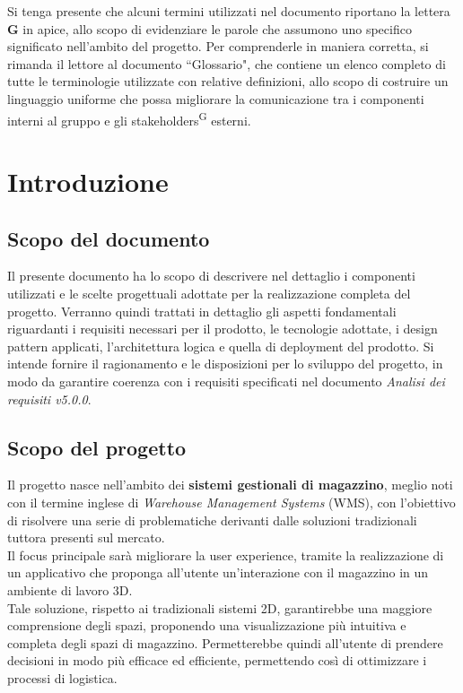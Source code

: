 \begin{beginningnote}
    Si tenga presente che alcuni termini utilizzati nel documento riportano la lettera \textbf{G} in apice, allo scopo di evidenziare le parole che assumono uno specifico significato nell'ambito del progetto. 
    Per comprenderle in maniera corretta, si rimanda il lettore al documento ``Glossario", che contiene un elenco completo di tutte le terminologie utilizzate con relative definizioni, 
    allo scopo di costruire un linguaggio uniforme che possa migliorare la comunicazione tra i componenti interni al gruppo e gli stakeholders\textsuperscript{G} esterni.   
\end{beginningnote}

\section{Introduzione}\label{sec:introduzione}
\subsection{Scopo del documento}\label{sec:introduzione:scopo_del_documento}
Il presente documento ha lo scopo di descrivere nel dettaglio i componenti utilizzati e le scelte progettuali adottate per la realizzazione completa del progetto.
Verranno quindi trattati in dettaglio gli aspetti fondamentali riguardanti i requisiti necessari per il prodotto, le tecnologie adottate, i design pattern applicati, l'architettura logica e quella di deployment del prodotto.
Si intende fornire il ragionamento e le disposizioni per lo sviluppo del progetto, in modo da garantire coerenza con i requisiti specificati nel documento \textit{Analisi dei requisiti v5.0.0}. 

\subsection{Scopo del progetto}\label{sec:introduzione:scopo_del_progetto}
Il progetto nasce nell'ambito dei \textbf{sistemi gestionali di magazzino}, meglio noti con il termine inglese di \textit{Warehouse Management Systems} (WMS), con 
l'obiettivo di risolvere una serie di problematiche derivanti dalle soluzioni tradizionali tuttora presenti sul mercato.\\
Il focus principale sarà migliorare la user experience, tramite la realizzazione di un applicativo che proponga all'utente un'interazione con il magazzino in un 
ambiente di lavoro 3D. \\
Tale soluzione, rispetto ai tradizionali sistemi 2D, garantirebbe una maggiore comprensione degli spazi, proponendo una visualizzazione più intuitiva e completa 
degli spazi di magazzino. Permetterebbe quindi all'utente di prendere decisioni in modo più efficace ed efficiente, permettendo così di ottimizzare i processi di logistica.

